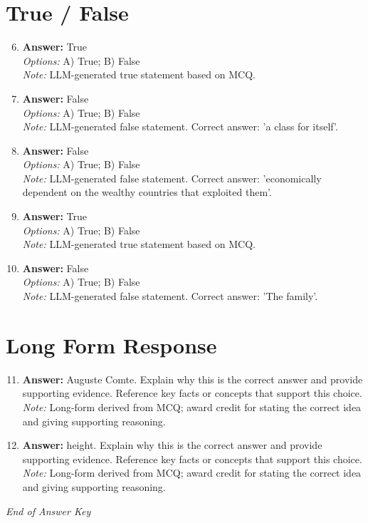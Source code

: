\documentclass[12pt]{article}
\begin{document}
\section*{True / False}
\begin{enumerate}[label=\arabic*.]
\setcounter{enumi}{5}
\item \textbf{Answer:} True
\\ \textit{Options:} A) True; B) False
\\ \textit{Note:} LLM-generated true statement based on MCQ.
\item \textbf{Answer:} False
\\ \textit{Options:} A) True; B) False
\\ \textit{Note:} LLM-generated false statement. Correct answer: 'a class for itself'.
\item \textbf{Answer:} False
\\ \textit{Options:} A) True; B) False
\\ \textit{Note:} LLM-generated false statement. Correct answer: 'economically dependent on the wealthy countries that exploited them'.
\item \textbf{Answer:} True
\\ \textit{Options:} A) True; B) False
\\ \textit{Note:} LLM-generated true statement based on MCQ.
\item \textbf{Answer:} False
\\ \textit{Options:} A) True; B) False
\\ \textit{Note:} LLM-generated false statement. Correct answer: 'The family'.
\end{enumerate}

\section*{Long Form Response}
\begin{enumerate}[label=\arabic*.]
\setcounter{enumi}{10}
\item \textbf{Answer:} Auguste Comte. Explain why this is the correct answer and provide supporting evidence. Reference key facts or concepts that support this choice.
\\ \textit{Note:} Long-form derived from MCQ; award credit for stating the correct idea and giving supporting reasoning.
\item \textbf{Answer:} height. Explain why this is the correct answer and provide supporting evidence. Reference key facts or concepts that support this choice.
\\ \textit{Note:} Long-form derived from MCQ; award credit for stating the correct idea and giving supporting reasoning.
\end{enumerate}

\vfill
\noindent\textit{End of Answer Key}
\end{document}
